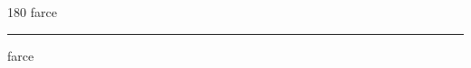 
\begin{frame}
\begin{center}
\begin{turn}{180}
{\fontsize{2.5cm}{1em}\selectfont farce}
\end{turn}
\vspace{1em}\par  
\hrule
\vspace{1em}\par  
{\fontsize{2.5cm}{1em}\selectfont farce}
\end{center}
\end{frame}
